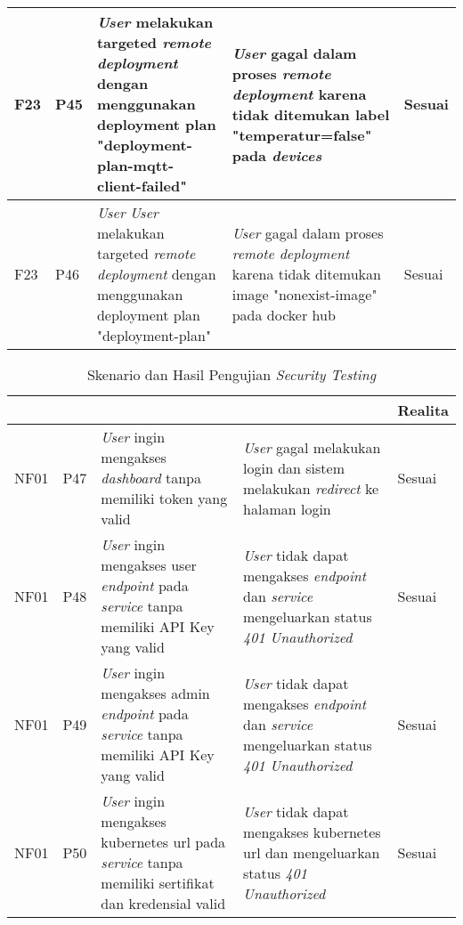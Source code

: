 \begin{table}[ht]
\begin{tabular}{|p{2cm}|p{2cm}|p{3cm}|p{3cm}|p{1.5cm}|}
    \hline
    F23                       & P45                      & \textit{User} melakukan targeted \textit{remote deployment} dengan menggunakan deployment plan "deployment-plan-mqtt-client-failed" & \textit{User} gagal dalam proses \textit{remote deployment} karena tidak ditemukan label "temperatur=false" pada \textit{devices} & Sesuai  \\
    \hline
    F23                       & P46                      & \textit{User} \textit{User} melakukan targeted \textit{remote deployment} dengan menggunakan deployment plan "deployment-plan"      & \textit{User} gagal dalam proses \textit{remote deployment} karena tidak ditemukan image "nonexist-image" pada docker hub         & Sesuai  \\
    \hline
  \end{tabular}
\end{table}
\egroup

\bgroup
\begin{table}[ht]
  \def\arraystretch{1.3}
  \caption{Skenario dan Hasil Pengujian \textit{Security Testing}}
  \label{tab:pengujian-nonfungsional-security}
  \centering
  \begin{tabular}{|p{2cm}|p{2cm}|p{3cm}|p{3cm}|p{1.5cm}|}
    \hline
    \centering{ID Fungsional} & \centering{ID Pengujian} & \centering{Skenario}                                                                                              & \centering{Ekspektasi}                                                                                                   & Realita \\
    \hline
    NF01                      & P47                      & \textit{User} ingin mengakses \textit{dashboard} tanpa memiliki token yang valid                                  & \textit{User} gagal melakukan login dan sistem melakukan \textit{redirect} ke halaman login                              & Sesuai  \\
    \hline
    NF01                      & P48                      & \textit{User} ingin mengakses user \textit{endpoint} pada \textit{service} tanpa memiliki API Key yang valid      & \textit{User} tidak dapat mengakses \textit{endpoint} dan \textit{service} mengeluarkan status \textit{401 Unauthorized} & Sesuai  \\
    \hline
    NF01                      & P49                      & \textit{User} ingin mengakses admin \textit{endpoint} pada \textit{service} tanpa memiliki API Key yang valid     & \textit{User} tidak dapat mengakses \textit{endpoint} dan \textit{service} mengeluarkan status \textit{401 Unauthorized} & Sesuai  \\
    \hline
    NF01                      & P50                      & \textit{User} ingin mengakses kubernetes url pada \textit{service} tanpa memiliki sertifikat dan kredensial valid & \textit{User} tidak dapat mengakses kubernetes url dan mengeluarkan status \textit{401 Unauthorized}                     & Sesuai  \\
    \hline
  \end{tabular}
\end{table}
\egroup

